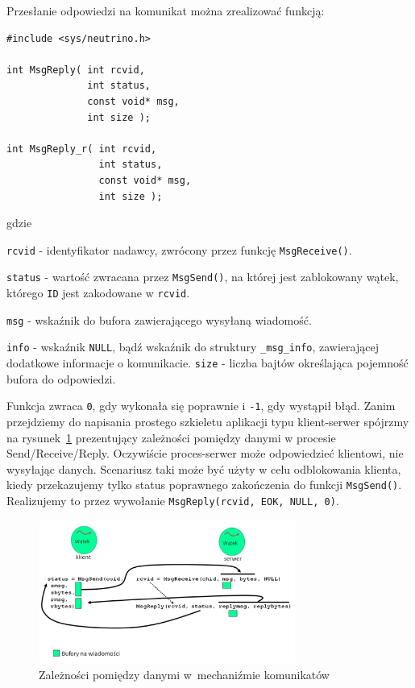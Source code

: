 Przesłanie odpowiedzi na komunikat można zrealizować funkcją:

\begin{lstlisting}[style=MyCStyle]
#include <sys/neutrino.h>

int MsgReply( int rcvid,
              int status,
              const void* msg,
              int size );

int MsgReply_r( int rcvid,
                int status,
                const void* msg,
                int size );
\end{lstlisting}

gdzie 

\begin{myitemize}
\item[] \lstinline[style=MyCStyle]{rcvid} - identyfikator nadawcy, zwrócony przez funkcję \lstinline[style=MyCStyle]{MsgReceive()}.
\item[] \lstinline[style=MyCStyle]{status} - wartość zwracana przez \lstinline[style=MyCStyle]{MsgSend()}, na której jest zablokowany wątek, którego \lstinline[style=MyCStyle]{ID} jest zakodowane w \lstinline[style=MyCStyle]{rcvid}.  
\item[] \lstinline[style=MyCStyle]{msg} - wskaźnik do bufora zawierającego wysyłaną wiadomość.
\item[] \lstinline[style=MyCStyle]{info} - wskaźnik \lstinline[style=MyCStyle]{NULL}, bądź wskaźnik do struktury \lstinline[style=MyCStyle]{_msg_info}, zawierającej dodatkowe informacje o komunikacie.  
\lstinline[style=MyCStyle]{size} - liczba bajtów określająca pojemność bufora do odpowiedzi.
\end{myitemize}

Funkcja zwraca \lstinline[style=MyCStyle]{0}, gdy wykonała się poprawnie i \lstinline[style=MyCStyle]{-1}, gdy wystąpił błąd. Zanim przejdziemy do napisania prostego szkieletu aplikacji typu klient-serwer spójrzmy na rysunek~\ref{fig:dependencies} prezentujący zależności pomiędzy danymi w procesie Send/Receive/Reply. Oczywiście proces-serwer może odpowiedzieć klientowi, nie wysyłając danych. Scenariusz taki może być użyty w celu odblokowania klienta, kiedy przekazujemy tylko status poprawnego zakończenia do funkcji \lstinline[style=MyCStyle]{MsgSend()}. Realizujemy to przez wywołanie \lstinline[style=MyCStyle]{MsgReply(rcvid, EOK, NULL, 0)}. 

\begin{figure}[!h]
\centering
\includegraphics[width=0.75\textwidth]{img/dependencies}
\caption{Zależności pomiędzy danymi w~mechaniźmie komunikatów}
\label{fig:dependencies}
\end{figure}



